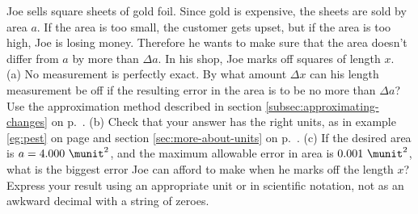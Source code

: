 Joe sells square sheets of gold foil. Since gold is expensive, the sheets
are sold by area $a$. If the area is too small, the customer gets upset, but
if the area is too high, Joe is losing money. Therefore he wants to make
sure that the area doesn't differ from $a$ by more than $\Delta a$.
In his shop, Joe marks off squares of length $x$.\\
(a) No measurement is perfectly exact. By what amount $\Delta x$ can his
length measurement be off if the resulting error in the area is
to be no more than $\Delta a$? Use the approximation method
described in section \ref{subsec:approximating-changes} on 
p.~\pageref{subsec:approximating-changes}.\answercheck\hwendpart
(b)  Check that your answer has the right units, as in example 
\ref{eg:pest} on page \pageref{eg:pest} and section \ref{sec:more-about-units} on p.~\pageref{sec:more-about-units}.\hwendpart
(c) If the desired area is $a=4.000\ \munit^2$, and
the maximum allowable error in area is $0.001\ \munit^2$,
what is the biggest error Joe can afford to make when he
marks off the length $x$? Express your result using an appropriate unit or in scientific notation, not
as an awkward decimal with a string of zeroes.\answercheck
